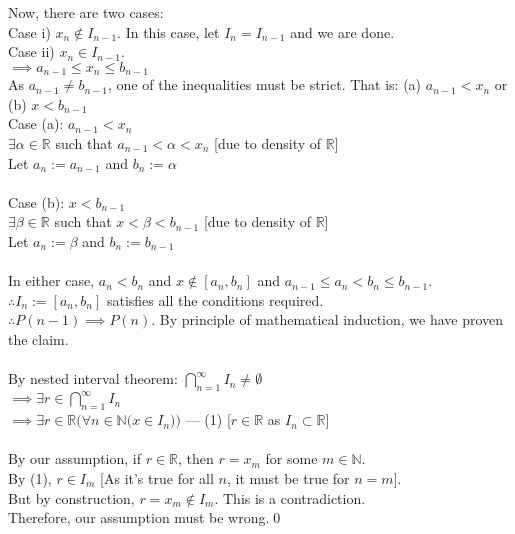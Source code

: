     Now, there are two cases:\\
    Case i) $x_n \not \in I_{n-1}$. In this case, let $I_n = I_{n-1}$ and we are done.\\
    Case ii) $x_n \in I_{n-1}$.\\
    $\implies a_{n-1} \le x_n \le b_{n-1}$\\
    As $a_{n-1}\neq b_{n-1}$, one of the inequalities must be strict. That is: (a) $a_{n-1} < x_n$ or (b) $x < b_{n-1}$\\
    Case (a): $a_{n-1} < x_n$\\
    $\exists \alpha \in \mathbb{R}$ such that $a_{n-1} < \alpha < x_n$ \hfill [due to density of $\mathbb{R}$]\\
    Let $a_n := a_{n-1}$ and $b_n:=\alpha$\\~\\
    Case (b): $x < b_{n-1}$\\
    $\exists \beta \in \mathbb{R}$ such that $x < \beta < b_{n-1}$ \hfill [due to density of $\mathbb{R}$]\\
    Let $a_n := \beta$ and $b_n:=b_{n-1}$\\~\\
    In either case, $a_n < b_n$ and $x\not\in[a_n, b_n]$ and $a_{n-1} \le a_{n} < b_{n} \le b_{n-1}$.\\
    $\therefore I_n:=[a_n, b_n]$ satisfies all the conditions required.\\
    $\therefore P(n-1)\implies P(n)$. By principle of mathematical induction, we have proven the claim.\\~\\
By nested interval theorem: $\displaystyle\bigcap_{n=1}^\infty I_n \neq \emptyset$\\
$\implies \exists r \in \displaystyle\bigcap_{n=1}^\infty I_n$\\
$\implies \exists r \in \mathbb{R}\Big(\forall n \in \mathbb{N}\big(x \in I_n\big)\Big)$ --- (1) \hfill [$r\in\mathbb{R}$ as $I_n\subset \mathbb{R}$]\\~\\
By our assumption, if $r\in\mathbb{R}$, then $r = x_m$ for some $m \in \mathbb{N}$.\\
By (1), $r\in I_m$ \hfill [As it's true for all $n$, it must be true for $n=m$].\\
But by construction, $r=x_m\not\in I_m$. This is a contradiction.\\
Therefore, our assumption must be wrong.\hfill\qed
